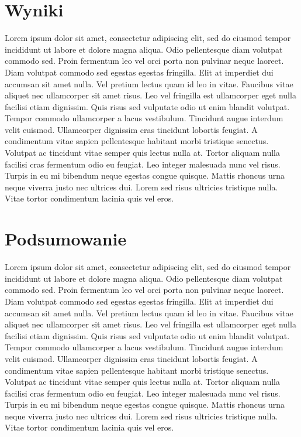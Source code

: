 \documentclass[W2, polski]{ThesisPLodz}
\begin{document}
\chapter{Wyniki} \label{ch:wyniki}
Lorem ipsum dolor sit amet, consectetur adipiscing elit, sed do eiusmod tempor incididunt ut labore et dolore magna aliqua. Odio pellentesque diam volutpat commodo sed. Proin fermentum leo vel orci porta non pulvinar neque laoreet. Diam volutpat commodo sed egestas egestas fringilla. Elit at imperdiet dui accumsan sit amet nulla. Vel pretium lectus quam id leo in vitae. Faucibus vitae aliquet nec ullamcorper sit amet risus. Leo vel fringilla est ullamcorper eget nulla facilisi etiam dignissim. Quis risus sed vulputate odio ut enim blandit volutpat. Tempor commodo ullamcorper a lacus vestibulum. Tincidunt augue interdum velit euismod. Ullamcorper dignissim cras tincidunt lobortis feugiat. A condimentum vitae sapien pellentesque habitant morbi tristique senectus. Volutpat ac tincidunt vitae semper quis lectus nulla at. Tortor aliquam nulla facilisi cras fermentum odio eu feugiat. Leo integer malesuada nunc vel risus. Turpis in eu mi bibendum neque egestas congue quisque. Mattis rhoncus urna neque viverra justo nec ultrices dui. Lorem sed risus ultricies tristique nulla. Vitae tortor condimentum lacinia quis vel eros.

\chapter{Podsumowanie} \label{ch:podsumowanie}
Lorem ipsum dolor sit amet, consectetur adipiscing elit, sed do eiusmod tempor incididunt ut labore et dolore magna aliqua. Odio pellentesque diam volutpat commodo sed. Proin fermentum leo vel orci porta non pulvinar neque laoreet. Diam volutpat commodo sed egestas egestas fringilla. Elit at imperdiet dui accumsan sit amet nulla. Vel pretium lectus quam id leo in vitae. Faucibus vitae aliquet nec ullamcorper sit amet risus. Leo vel fringilla est ullamcorper eget nulla facilisi etiam dignissim. Quis risus sed vulputate odio ut enim blandit volutpat. Tempor commodo ullamcorper a lacus vestibulum. Tincidunt augue interdum velit euismod. Ullamcorper dignissim cras tincidunt lobortis feugiat. A condimentum vitae sapien pellentesque habitant morbi tristique senectus. Volutpat ac tincidunt vitae semper quis lectus nulla at. Tortor aliquam nulla facilisi cras fermentum odio eu feugiat. Leo integer malesuada nunc vel risus. Turpis in eu mi bibendum neque egestas congue quisque. Mattis rhoncus urna neque viverra justo nec ultrices dui. Lorem sed risus ultricies tristique nulla. Vitae tortor condimentum lacinia quis vel eros.
\end{document}

